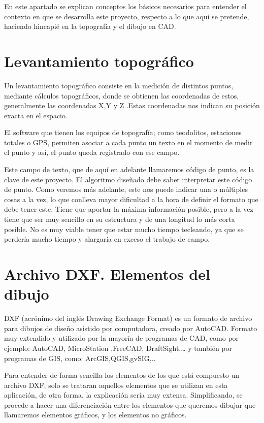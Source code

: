 
En este apartado se explican conceptos los básicos necesarios para entender el contexto en que se desarrolla este proyecto, respecto a lo que aquí se pretende, haciendo hincapié en la topografía y el dibujo en CAD. 

\section{Levantamiento topográfico}

Un levantamiento topográfico consiste en la medición de distintos puntos, mediante cálculos topográficos, donde se obtienen las coordenadas de estos, generalmente las coordenadas X,Y y Z .Estas coordenadas nos indican su posición exacta en el espacio. 

El software que tienen los equipos de topografía; como teodolitos, estaciones totales o GPS, permiten asociar a cada punto un texto en el momento de medir el punto y así, el punto queda registrado con ese campo.

Este campo de texto, que de aquí en adelante llamaremos código de punto, es la clave de este proyecto. El algoritmo diseñado debe saber interpretar este código de punto. Como veremos más adelante, este nos puede indicar una o múltiples cosas a la vez, lo que conlleva mayor dificultad a la hora de definir el formato que debe tener este. Tiene que aportar la máxima información posible, pero a la vez tiene que ser muy sencillo en su estructura y de una longitud lo más corta posible. No es muy viable tener que estar mucho tiempo tecleando, ya que se perdería mucho tiempo y alargaría en exceso el trabajo de campo.

\section{Archivo DXF. Elementos del dibujo}

DXF (acrónimo del inglés Drawing Exchange Format) es un formato de archivo para dibujos de diseño asistido por computadora, creado por AutoCAD. Formato muy extendido y utilizado por la mayoría de programas de CAD, como por ejemplo: AutoCAD, MicroStation ,FreeCAD,  DraftSight,… y también por programas de GIS, como: ArcGIS,QGIS,gvSIG,..

Para entender de forma sencilla los elementos de los que está compuesto un archivo DXF, solo se trataran aquellos elementos que se utilizan en esta aplicación, de otra forma, la explicación sería muy extensa.
Simplificando, se procede a hacer una diferenciación entre los elementos que queremos dibujar que llamaremos elementos gráficos, y los elementos no gráficos.

